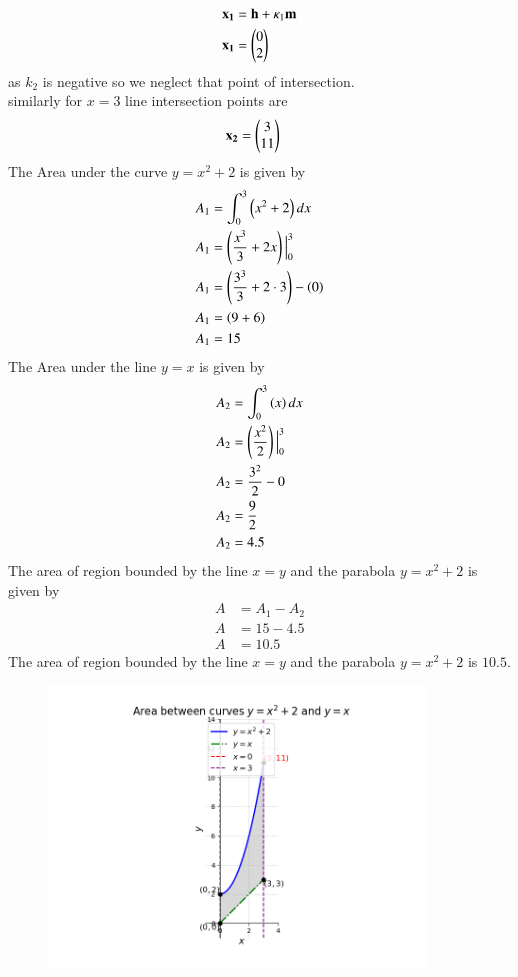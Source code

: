 \documentclass[journal]{IEEEtran}
\begin{document}
\begin{align}
\mathbf{x_1} &= \mathbf{h}+\kappa_1\mathbf{m}\\
\mathbf{x_1} &= \begin{pmatrix}0\\2\end{pmatrix}
\end{align}
as $k_2$ is negative so we neglect that point of intersection.\\
similarly for $x=3$ line intersection points are
\begin{align}
    \mathbf{x_2} &= \begin{pmatrix}3\\11\end{pmatrix}
\end{align}
The Area under the curve $y=x^2+2$ is given by
\begin{align}
A_1 &= \int_{0}^{3}\left(x^2+2\right)dx\\
A_1 &= \left(\frac{x^3}{3} + 2x\right) \Big|_0^3\\
A_1 &= \left(\frac{3^3}{3} + 2\cdot 3\right) - \left(0\right)\\
A_1 &= \left(9 + 6\right)\\
A_1 &= 15
\end{align}
The Area under the line $y=x$ is given by
\begin{align}
A_2 &= \int_{0}^{3}\left(x\right)dx\\
A_2 &= \left(\frac{x^2}{2}\right) \Big|_0^3\\
A_2 &= \frac{3^2}{2} - 0\\
A_2 &= \frac{9}{2}\\
A_2 &= 4.5
\end{align}
The area of region bounded by the line $x=y$ and the parabola $y=x^2+2$ is given by
\begin{align}
A &= A_1-A_2\\
A &= 15 - 4.5\\
A &= 10.5
\end{align}
The area of region bounded by the line $x=y$ and the parabola $y=x^2+2$ is $10.5$.
\begin{figure}[htp]
    \centering
    \includegraphics[width=10cm]{figs/Figure_1.png}
\end{figure}
\end{document}
